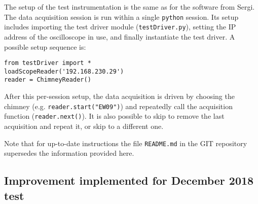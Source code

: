 The setup of the test instrumentation is the same as for the software
from Sergi. The data acquisition session is run within a single
\texttt{python} session. Its setup includes importing the test driver
module (\texttt{testDriver.py}), setting the IP address of the
oscilloscope in use, and finally instantiate the test driver. A possible
setup sequence is:
\begin{verbatim}
from testDriver import *
loadScopeReader('192.168.230.29')
reader = ChimneyReader()
\end{verbatim}
After this per-session setup, the data acquisition is driven by choosing
the chimney (e.g. \texttt{reader.start("EW09")}) and repeatedly call the
acquisition function (\texttt{reader.next()}). It is also possible to
skip to remove the last acquisition and repeat it, or skip to a
different one.

Note that for up-to-date instructions the file \texttt{README.md} in the GIT
repository supersedes the information provided here.


\subsection{Improvement implemented for December 2018 test}
\label{apx:DAQsoftwareSetup:Future}


